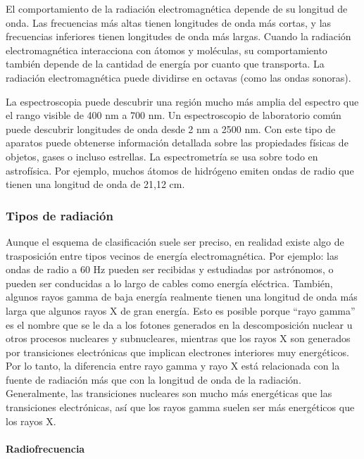 \documentclass[12pt]{article}
\begin{document}
\vspace{0.4cm}

El comportamiento de la radiaci\'on electromagn\'etica depende de su longitud de onda. Las frecuencias m\'as altas tienen longitudes de onda m\'as cortas, y las frecuencias inferiores tienen longitudes de onda m\'as largas. Cuando la radiaci\'on electromagn\'etica interacciona con \'atomos y mol\'eculas, su comportamiento tambi\'en depende de la cantidad de energ\'ia por cuanto que transporta. La radiaci\'on electromagn\'etica puede dividirse en octavas (como las ondas sonoras).
\vspace{0.4cm}

La espectroscopia puede descubrir una regi\'on mucho m\'as amplia del espectro que el rango visible de 400 nm a 700 nm. Un espectroscopio de laboratorio com\'un puede descubrir longitudes de onda desde 2 nm a 2500 nm. Con este tipo de aparatos puede obtenerse informaci\'on detallada sobre las propiedades f\'isicas de objetos, gases o incluso estrellas. La espectrometr\'ia se usa sobre todo en astrof\'isica. Por ejemplo, muchos \'atomos de hidr\'ogeno emiten ondas de radio que tienen una longitud de onda de 21,12 cm.

\subsubsection{Tipos de radiaci\'on}
Aunque el esquema de clasificaci\'on suele ser preciso, en realidad existe algo de trasposici\'on entre tipos vecinos de energ\'ia electromagn\'etica. Por ejemplo: las ondas de radio a 60 Hz pueden ser recibidas y estudiadas por astr\'onomos, o pueden ser conducidas a lo largo de cables como energ\'ia el\'ectrica. Tambi\'en, algunos rayos gamma de baja energ\'ia realmente tienen una longitud de onda m\'as larga que algunos rayos X de gran energ\'ia. Esto es posible porque ``rayo gamma'' es el nombre que se le da a los fotones generados en la descomposici\'on nuclear u otros procesos nucleares y subnucleares, mientras que los rayos X son generados por transiciones electr\'onicas que implican electrones interiores muy energ\'eticos. Por lo tanto, la diferencia entre rayo gamma y rayo X est\'a relacionada con la fuente de radiaci\'on m\'as que con la longitud de onda de la radiaci\'on. Generalmente, las transiciones nucleares son mucho m\'as energ\'eticas que las transiciones electr\'onicas, as\'i que los rayos gamma suelen ser m\'as energ\'eticos que los rayos X.

\paragraph{Radiofrecuencia}
\end{document}
